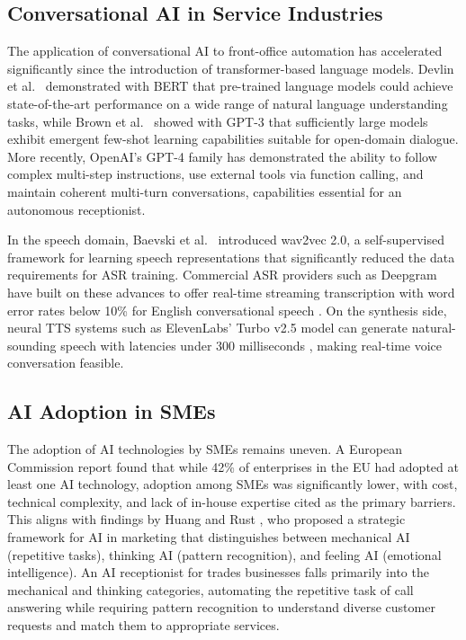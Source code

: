 \documentclass[conference]{IEEEtran}
\begin{document}
\subsection{Conversational AI in Service Industries}

The application of conversational AI to front-office automation has accelerated significantly since the introduction of transformer-based language models. Devlin et al.\ \cite{b7} demonstrated with BERT that pre-trained language models could achieve state-of-the-art performance on a wide range of natural language understanding tasks, while Brown et al.\ \cite{b3} showed with GPT-3 that sufficiently large models exhibit emergent few-shot learning capabilities suitable for open-domain dialogue. More recently, OpenAI's GPT-4 family \cite{b16} has demonstrated the ability to follow complex multi-step instructions, use external tools via function calling, and maintain coherent multi-turn conversations, capabilities essential for an autonomous receptionist.

In the speech domain, Baevski et al.\ \cite{b1} introduced wav2vec 2.0, a self-supervised framework for learning speech representations that significantly reduced the data requirements for ASR training. Commercial ASR providers such as Deepgram have built on these advances to offer real-time streaming transcription with word error rates below 10\% for English conversational speech \cite{b6}. On the synthesis side, neural TTS systems such as ElevenLabs' Turbo v2.5 model can generate natural-sounding speech with latencies under 300 milliseconds \cite{b9}, making real-time voice conversation feasible.

\subsection{AI Adoption in SMEs}

The adoption of AI technologies by SMEs remains uneven. A European Commission report \cite{b10} found that while 42\% of enterprises in the EU had adopted at least one AI technology, adoption among SMEs was significantly lower, with cost, technical complexity, and lack of in-house expertise cited as the primary barriers. This aligns with findings by Huang and Rust \cite{b11}, who proposed a strategic framework for AI in marketing that distinguishes between mechanical AI (repetitive tasks), thinking AI (pattern recognition), and feeling AI (emotional intelligence). An AI receptionist for trades businesses falls primarily into the mechanical and thinking categories, automating the repetitive task of call answering while requiring pattern recognition to understand diverse customer requests and match them to appropriate services.
\end{document}

